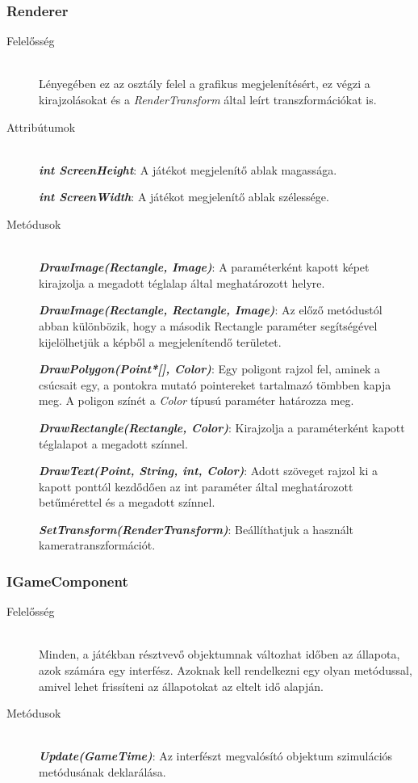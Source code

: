 \subsubsection{Renderer}
	\begin{description}
		\item[Felelősség] \hfill \\
		Lényegében ez az osztály felel a grafikus megjelenítésért, ez végzi a kirajzolásokat és a {\itshape RenderTransform} által leírt transzformációkat is.
		
		\item[Attribútumok]\hfill \\
		\textbf{\emph{int ScreenHeight}}: A játékot megjelenítő ablak magassága.
		
		\textbf{\emph{int ScreenWidth}}: A játékot megjelenítő ablak szélessége.		
				
		\item[Metódusok]\hfill \\
		\textbf{\emph{DrawImage(Rectangle, Image)}}: A paraméterként kapott képet kirajzolja a megadott téglalap által meghatározott helyre.
		
		\textbf{\emph{DrawImage(Rectangle, Rectangle, Image)}}: Az előző metódustól abban különbözik, hogy a második Rectangle paraméter segítségével kijelölhetjük a képből a megjelenítendő területet.
		
		\textbf{\emph{DrawPolygon(Point*[], Color)}}: Egy poligont rajzol fel, aminek a csúcsait egy, a pontokra mutató pointereket tartalmazó tömbben kapja meg. A poligon színét a {\itshape Color} típusú paraméter határozza meg.
		
		\textbf{\emph{DrawRectangle(Rectangle, Color)}}: Kirajzolja a paraméterként kapott téglalapot a megadott színnel.
		
		\textbf{\emph{DrawText(Point, String, int, Color)}}: Adott szöveget rajzol ki a kapott ponttól kezdődően az int paraméter által meghatározott betűmérettel és a megadott színnel.
		
		\textbf{\emph{SetTransform(RenderTransform)}}: Beállíthatjuk a használt kameratranszformációt.
						
	\end{description}
	
	
\subsubsection{IGameComponent}
	\begin{description}
		\item[Felelősség] \hfill \\
		Minden, a játékban résztvevő objektumnak változhat időben az állapota, azok számára egy interfész. Azoknak kell rendelkezni egy olyan metódussal, amivel lehet frissíteni az állapotokat az eltelt idő alapján.

		\item[Metódusok]\hfill \\
		\textbf{\emph{Update(GameTime)}}: Az interfészt megvalósító objektum szimulációs metódusának deklarálása.
	\end{description}
	
